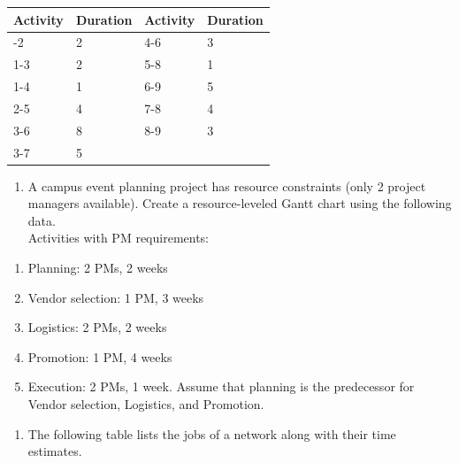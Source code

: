 \documentclass[
  letterpaper,
  DIV=11,
  numbers=noendperiod]{scrreprt}
\providecommand{\tightlist}{%
  \setlength{\itemsep}{0pt}\setlength{\parskip}{0pt}}
\begin{document}
\begin{longtable}[]{@{}llll@{}}
\toprule\noalign{}
Activity & Duration & Activity & Duration \\
\midrule\noalign{}
\endhead
\bottomrule\noalign{}
\endlastfoot
1-2 & 2 & 4-6 & 3 \\
1-3 & 2 & 5-8 & 1 \\
1-4 & 1 & 6-9 & 5 \\
2-5 & 4 & 7-8 & 4 \\
3-6 & 8 & 8-9 & 3 \\
3-7 & 5 & & \\
\end{longtable}

\begin{enumerate}
\def\labelenumi{\arabic{enumi}.}
\setcounter{enumi}{4}
\tightlist
\item
  A campus event planning project has resource constraints (only 2
  project managers available). Create a resource-leveled Gantt chart
  using the following data.\\
  Activities with PM requirements:
\end{enumerate}

\begin{enumerate}
\def\labelenumi{\roman{enumi}.}
\tightlist
\item
  Planning: 2 PMs, 2 weeks
\item
  Vendor selection: 1 PM, 3 weeks
\item
  Logistics: 2 PMs, 2 weeks
\item
  Promotion: 1 PM, 4 weeks
\item
  Execution: 2 PMs, 1 week. Assume that planning is the predecessor for
  Vendor selection, Logistics, and Promotion.
\end{enumerate}

\begin{enumerate}
\def\labelenumi{\arabic{enumi}.}
\setcounter{enumi}{5}
\tightlist
\item
  The following table lists the jobs of a network along with their time
  estimates.
\end{enumerate}
\end{document}
